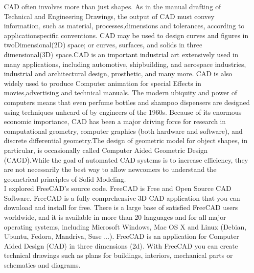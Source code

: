   CAD  often  involves  more  than  just  shapes.  As  in  the  manual  drafting  of  Technical  and  Engineering
Drawings,  the  output  of  CAD  must  convey  information,  such  as  material,  processes,dimensions  and
tolerances,  according  to  application­specific  conventions.  CAD  may  be  used  to  design  curves  and
figures  in  two­Dimensional(2D)  space;  or  curves,  surfaces,  and  solids  in  three  dimensional(3D)
space.CAD  is  an  important  industrial  art  extensively  used  in  many  applications,  including  automotive,
shipbuilding,  and  aerospace  industries,  industrial  and  architectural  design, prosthetic,  and  many  more.
CAD  is  also  widely  used  to  produce  Computer  animation  for  special  Effects  in  movies,advertising  and
technical  manuals.  The  modern  ubiquity  and  power  of  computers  means  that  even  perfume  bottles  and
shampoo  dispensers  are  designed  using   techniques unheard of by engineers of the 1960s. Because  of its
enormous  economic  importance,  CAD  has  been  a  major  driving  force  for  research  in  computational
geometry,  computer  graphics  (both  hardware  and  software),  and  discrete  differential  geometry.The
design  of  geometric  model  for  object  shapes,  in  particular,  is  occasionally  called  Computer ­Aided
Geometric  Design  (CAGD).While  the  goal  of  automated  CAD  systems  is to increase efficiency, they are
not  necessarily  the  best  way   to  allow  newcomers  to  understand  the  geometrical  principles  of  Solid
Modeling.\\

  I  explored  FreeCAD's  source  code.  FreeCAD is Free and Open Source CAD Software. FreeCAD is
a  fully  comprehensive  3D  CAD   application  that  you  can  download  and  install  for  free.  There  is  a  large
base  of  satisfied  FreeCAD   users  worldwide,  and  it  is  available  in  more  than  20  languages  and  for  all
major  operating  systems,  including  Microsoft  Windows,  Mac  OS  X  and  Linux  (Debian,  Ubuntu,
Fedora,  Mandriva,  Suse  ...).  FreeCAD  is  an  application  for Computer  Aided  Design  (CAD)  in  three
dimensions  (2d).  With  FreeCAD   you   can  create  technical  drawings  such  as  plans  for  buildings,  interiors,
mechanical parts or schematics and diagrams.\\

